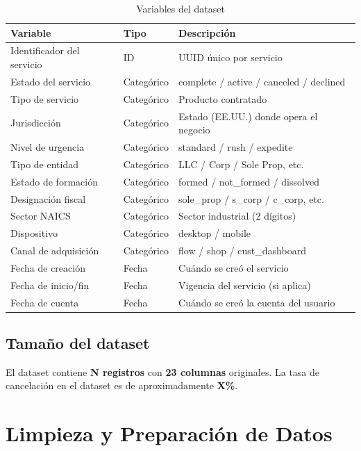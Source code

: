 \documentclass[12pt,letterpaper]{article}
\begin{document}
\begin{table}[H]
\centering
\caption{Variables del dataset}
\begin{tabular}{lll}
\toprule
\textbf{Variable} & \textbf{Tipo} & \textbf{Descripción} \\
\midrule
Identificador del servicio & ID       & UUID único por servicio \\
Estado del servicio        & Categórico & complete / active / canceled / declined \\
Tipo de servicio           & Categórico & Producto contratado \\
Jurisdicción               & Categórico & Estado (EE.UU.) donde opera el negocio \\
Nivel de urgencia          & Categórico & standard / rush / expedite \\
Tipo de entidad            & Categórico & LLC / Corp / Sole Prop, etc. \\
Estado de formación        & Categórico & formed / not\_formed / dissolved \\
Designación fiscal         & Categórico & sole\_prop / s\_corp / c\_corp, etc. \\
Sector NAICS               & Categórico & Sector industrial (2 dígitos) \\
Dispositivo                & Categórico & desktop / mobile \\
Canal de adquisición       & Categórico & flow / shop / cust\_dashboard \\
Fecha de creación          & Fecha      & Cuándo se creó el servicio \\
Fecha de inicio/fin        & Fecha      & Vigencia del servicio (si aplica) \\
Fecha de cuenta            & Fecha      & Cuándo se creó la cuenta del usuario \\
\bottomrule
\end{tabular}
\end{table}

\subsection{Tamaño del dataset}
El dataset contiene \textbf{N registros} con \textbf{23 columnas} originales.
La tasa de cancelación en el dataset es de aproximadamente \textbf{X\%}.

\section{Limpieza y Preparación de Datos}
\end{document}
